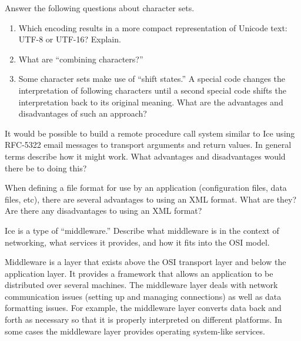\documentclass[12pt]{examdesign}
\begin{document}
\begin{shortanswer}[title={Short Answer}]
  \begin{question}
    Answer the following questions about character sets.
    \begin{enumerate}
      \item Which encoding results in a more compact representation of Unicode text: UTF-8 or UTF-16? Explain.
      \item What are ``combining characters?''
      \item Some character sets make use of ``shift states.'' A special code changes the interpretation of following characters until a second special code shifts the interpretation back to its original meaning. What are the advantages and disadvantages of such an approach?
    \end{enumerate}
    \begin{answer}
    \end{answer}
    \pagebreak
  \end{question}

  \begin{question}
    It would be possible to build a remote procedure call system similar to Ice using RFC-5322 email messages to transport arguments and return values. In general terms describe how it might work. What advantages and disadvantages would there be to doing this?
    \begin{answer}
    \end{answer}
    \pagebreak
  \end{question}
  
  \begin{question}
    When defining a file format for use by an application (configuration files, data files, etc), there are several advantages to using an XML format. What are they? Are there any disadvantages to using an XML format?
    \begin{answer}
    \end{answer}
    \pagebreak
  \end{question}
  
  \begin{question}
    Ice is a type of ``middleware.'' Describe what middleware is in the context of networking, what services it provides, and how it fits into the OSI model.

    \begin{answer}
     Middleware is a layer that exists above the OSI transport layer and below the application layer. It provides a framework that allows an application to be distributed over several machines. The middleware layer deals with network communication issues (setting up and managing connections) as well as data formatting issues. For example, the middleware layer converts data back and forth as necessary so that it is properly interpreted on different platforms. In some cases the middleware layer provides operating system-like services.


\end{answer}
\end{question}
\end{shortanswer}
\end{document}
